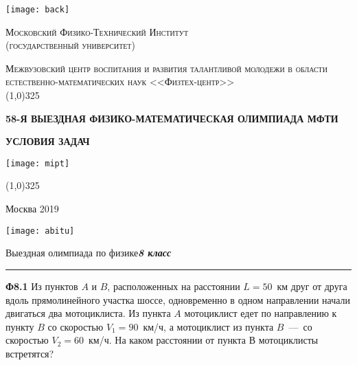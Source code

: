 \documentclass[12pt, a4paper, usenames]{article}
\begin{document}
\begin{titlepage}

\parbox[b][6cm][t]{50mm}{
\texttt{[image: back]}}
\hfill
\parbox[b][6cm][t]{115mm}{
\begin{center}
\textsc{\Large Московский Физико-Технический Институт\\ (государственный университет)}\\

\vspace{12pt}

\textsc{\Large Межвузовский центр воспитания и развития талантливой молодежи в области естественно-математических наук <<Физтех-центр>>}\\

\textcolor[rgb]{0.0274, 0.4509, 0.7333}{\line(1,0){325}}
\end{center}
}

\vspace*{-40pt}

\vspace{200pt}

\begin{center}
\begin{spacing}{2.0}
{ \LARGE \bfseries 58-Я ВЫЕЗДНАЯ ФИЗИКО-МАТЕМАТИЧЕСКАЯ ОЛИМПИАДА МФТИ}\\
\end{spacing}

\textcolor[rgb]{0.0274, 0.4509, 0.7333}{{ \LARGE \bfseries УСЛОВИЯ ЗАДАЧ}}
\end{center}

\vspace{220pt}

\parbox[b][2cm][t]{30mm}{
\texttt{[image: mipt]}}
\hfill
\parbox[b][2cm][t]{70mm}{
\vspace{10pt}
\linethickness{5pt}
\textcolor[rgb]{0.0274, 0.4509, 0.7333}{\line(1,0){325}}
\begin{center} \hspace{2 cm} Москва 2019 \end{center}
}
\hfill
\parbox[b][2cm][t]{40mm}{
\texttt{[image: abitu]}}

\end{titlepage}




\newpage
\begin{center}
Выездная олимпиада по физике\hfill\textit{\bf 8 класс}
\hrule\medskip
\end{center}

{\bf Ф8.1} Из пунктов $A$ и $B$, расположенных на расстоянии $L=50$~км друг от друга вдоль прямолинейного участка шоссе, одновременно в одном направлении начали двигаться два мотоциклиста. Из пункта $A$ мотоциклист едет по направлению к пункту $B$ со скоростью $V_1= 90$~км/ч, а мотоциклист из пункта $B$~---~со скоростью $V_2 = 60$~км/ч. На каком расстоянии от пункта В мотоциклисты встретятся?
\end{document}
